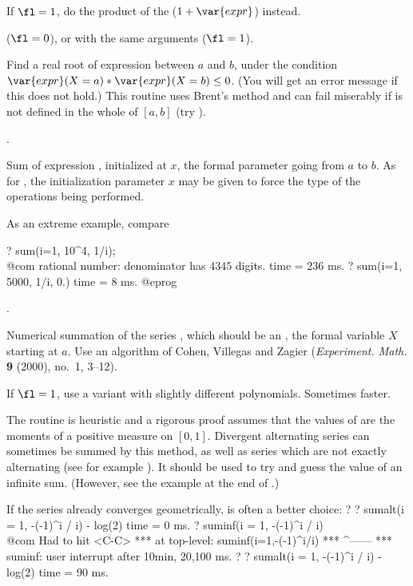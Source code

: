 If $\fl=1$, do the product of the ($1+\var{expr}$) instead.

($\fl=0$), or  with the same arguments ($\fl=1$).

\label{se:solve}
Find a real root of expression
 between $a$ and $b$, under the condition
$\var{expr}(X=a) * \var{expr}(X=b) \le 0$. (You will get an error message
 if this does not hold.)
This routine uses Brent's method and can fail miserably if  is
not defined in the whole of $[a,b]$ (try ).

.

\label{se:sum}
Sum of expression ,
initialized at $x$, the formal parameter going from $a$ to $b$. As for
, the initialization parameter $x$ may be given to force the type
of the operations being performed.

\noindent As an extreme example, compare

\bprog
? sum(i=1, 10^4, 1/i); \\@com rational number: denominator has $4345$ digits.
time = 236 ms.
? sum(i=1, 5000, 1/i, 0.)
time = 8 ms.
@eprog

.

\label{se:sumalt}
Numerical summation of the series , which should be an
, the formal variable $X$ starting at $a$. Use an
algorithm of Cohen, Villegas and Zagier (\emph{Experiment. Math.} {\bf 9}
(2000), no.~1, 3--12).

If $\fl=1$, use a variant with slightly different polynomials. Sometimes
faster.

The routine is heuristic and a rigorous proof assumes that the values of
 are the moments of a positive measure on $[0,1]$. Divergent
alternating series can sometimes be summed by this method, as well as series
which are not exactly alternating (see for example
). It should be used to try and guess the value of
an infinite sum. (However, see the example at the end of
.)

If the series already converges geometrically,
 is often a better choice:
\bprog
? 
? sumalt(i = 1, -(-1)^i / i)  - log(2)
time = 0 ms.
? suminf(i = 1, -(-1)^i / i)   \\@com Had to hit <C-C>
  ***   at top-level: suminf(i=1,-(-1)^i/i)
  ***                                ^------
  *** suminf: user interrupt after 10min, 20,100 ms.
? 
? sumalt(i = 1, -(-1)^i / i)  - log(2)
time = 90 ms.

